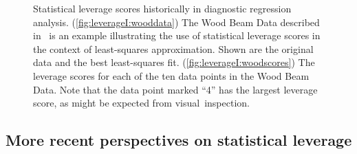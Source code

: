 \documentclass[twoside]{article}
\begin{document}
\begin{figure}
   \begin{center}
 \qquad {} 
\end{center}
\caption{Statistical leverage scores historically in diagnostic regression
analysis.
(\ref{fig:leverageI:wooddata})
The Wood Beam Data described in~\cite{HW78} is an example illustrating the
use of statistical leverage scores in the context of least-squares 
approximation.
Shown are the original data and the best least-squares fit.
(\ref{fig:leverageI:woodscores})
The leverage scores for each of the ten data points in the Wood Beam Data.
Note that the data point marked ``4'' has the largest leverage score, as 
might be expected from visual~inspection.
}
\label{fig:leverageI}
\end{figure}


\subsection{More recent perspectives on statistical leverage} 
\label{sxn:empirical-morerecent}
\end{document}

